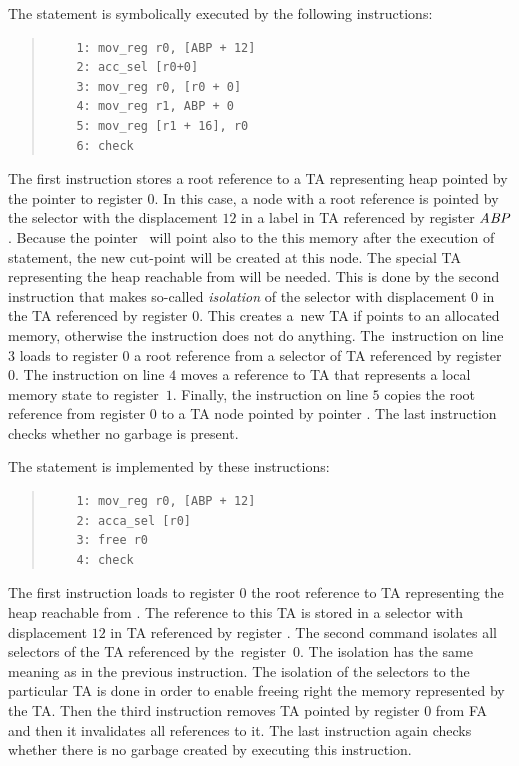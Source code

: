 \bexmp
	The statement  is symbolically executed by the following instructions:
	\begin{quote}
	\begin{verbatim}
	1: mov_reg r0, [ABP + 12]
	2: acc_sel [r0+0]
	3: mov_reg r0, [r0 + 0]
	4: mov_reg r1, ABP + 0
	5: mov_reg [r1 + 16], r0    
	6: check
	\end{verbatim}
	\end{quote}

	The first instruction stores a root reference to a TA representing heap pointed by the pointer  to register $0$.
	In this case, a node with a root reference is pointed by the selector with the displacement $12$ in a label in TA referenced by register $\abp$.
	Because the pointer~ will point also to the this memory after the execution of statement,
	the new cut-point will be created at this node.
	The special TA representing the heap reachable from  will be needed.
	This is done by the second instruction that makes so-called \emph{isolation}
	of the selector with displacement $0$ in the TA referenced by register $0$.
	This creates a~new TA if  points to an allocated memory, otherwise the instruction does not do anything.
	The~instruction on line $3$ loads to register $0$ a root reference from a selector of TA referenced by register~$0$.
	The instruction on line $4$ moves a reference to TA that represents a local memory state to register~$1$.
	Finally, the instruction on line $5$ copies the root reference from register $0$ to
	a TA node pointed by pointer .
	The last instruction checks whether no garbage is present.
\eexmp

\bexmp
	The statement  is implemented by these instructions:
	\begin{quote}
	\begin{verbatim}
	1: mov_reg r0, [ABP + 12]
	2: acca_sel [r0]
	3: free r0
	4: check
	\end{verbatim}
	\end{quote}

	The first instruction loads to register $0$ the root reference to TA
	representing the heap reachable from .
	The reference to this TA is stored in a selector with displacement $12$
	in TA referenced by register \codix{$\abp$}.
	The second command isolates all selectors of the TA referenced by the~register~$0$.
	The isolation has the same meaning as in the previous instruction.
	The isolation of the selectors to the particular TA is done in order to enable
	freeing right the memory represented by the TA.
	Then the third instruction removes TA pointed by register $0$ from FA
	and then it invalidates all references to it.
	The last instruction again checks whether there is no garbage created
	by executing this instruction.

